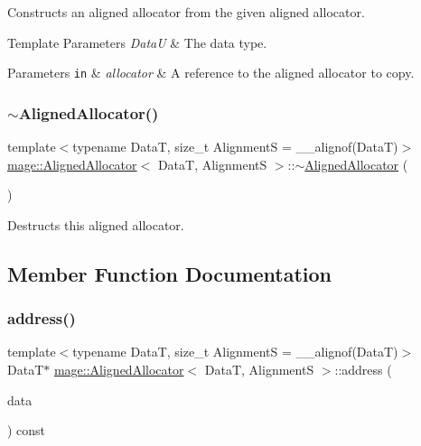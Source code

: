 Constructs an aligned allocator from the given aligned allocator.


\begin{DoxyTemplParams}{Template Parameters}
{\em DataU} & The data type. \\
\hline
\end{DoxyTemplParams}

\begin{DoxyParams}[1]{Parameters}
\mbox{\tt in}  & {\em allocator} & A reference to the aligned allocator to copy. \\
\hline
\end{DoxyParams}
\hypertarget{structmage_1_1_aligned_allocator_a98bda5c375a177eaa71cd622622451eb}{}\label{structmage_1_1_aligned_allocator_a98bda5c375a177eaa71cd622622451eb} 
\subsubsection{\texorpdfstring{$\sim$\+Aligned\+Allocator()}{~AlignedAllocator()}}
{\footnotesize\ttfamily template$<$typename DataT, size\+\_\+t AlignmentS = \+\_\+\+\_\+alignof(\+Data\+T)$>$ \\
\hyperlink{structmage_1_1_aligned_allocator}{mage\+::\+Aligned\+Allocator}$<$ DataT, AlignmentS $>$\+::$\sim$\hyperlink{structmage_1_1_aligned_allocator}{Aligned\+Allocator} (\begin{DoxyParamCaption}{ }\end{DoxyParamCaption})\hspace{0.3cm}{\ttfamily [default]}}

Destructs this aligned allocator. 

\subsection{Member Function Documentation}
\hypertarget{structmage_1_1_aligned_allocator_a8c7fc099279194e37afa8e4dae1a64fa}{}\label{structmage_1_1_aligned_allocator_a8c7fc099279194e37afa8e4dae1a64fa} 
\subsubsection{\texorpdfstring{address()}{address()}\hspace{0.1cm}{\footnotesize\ttfamily [1/2]}}
{\footnotesize\ttfamily template$<$typename DataT, size\+\_\+t AlignmentS = \+\_\+\+\_\+alignof(\+Data\+T)$>$ \\
DataT$\ast$ \hyperlink{structmage_1_1_aligned_allocator}{mage\+::\+Aligned\+Allocator}$<$ DataT, AlignmentS $>$\+::address (\begin{DoxyParamCaption}\item[{DataT \&}]{data }\end{DoxyParamCaption}) const\hspace{0.3cm}{\ttfamily [noexcept]}}

